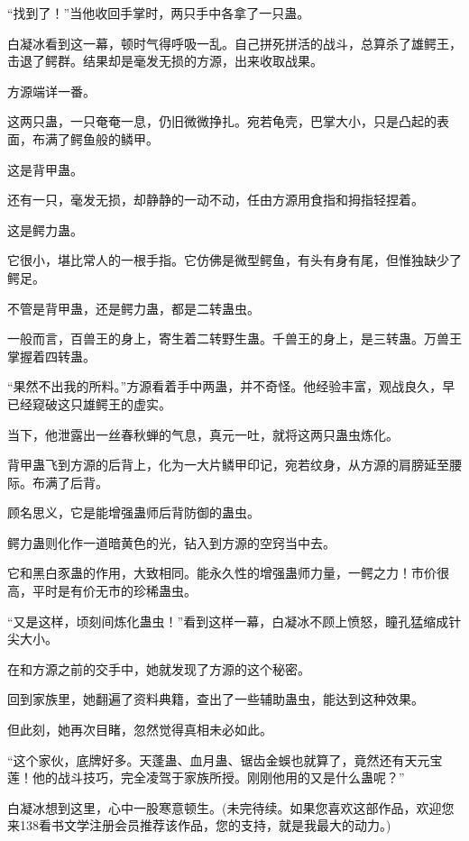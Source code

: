 \begin{this_body}
“找到了！”当他收回手掌时，两只手中各拿了一只蛊。

白凝冰看到这一幕，顿时气得呼吸一乱。自己拼死拼活的战斗，总算杀了雄鳄王，击退了鳄群。结果却是毫发无损的方源，出来收取战果。

方源端详一番。

这两只蛊，一只奄奄一息，仍旧微微挣扎。宛若龟壳，巴掌大小，只是凸起的表面，布满了鳄鱼般的鳞甲。

这是背甲蛊。

还有一只，毫发无损，却静静的一动不动，任由方源用食指和拇指轻捏着。

这是鳄力蛊。

它很小，堪比常人的一根手指。它仿佛是微型鳄鱼，有头有身有尾，但惟独缺少了鳄足。

不管是背甲蛊，还是鳄力蛊，都是二转蛊虫。

一般而言，百兽王的身上，寄生着二转野生蛊。千兽王的身上，是三转蛊。万兽王掌握着四转蛊。

“果然不出我的所料。”方源看着手中两蛊，并不奇怪。他经验丰富，观战良久，早已经窥破这只雄鳄王的虚实。

当下，他泄露出一丝春秋蝉的气息，真元一吐，就将这两只蛊虫炼化。

背甲蛊飞到方源的后背上，化为一大片鳞甲印记，宛若纹身，从方源的肩膀延至腰际。布满了后背。

顾名思义，它是能增强蛊师后背防御的蛊虫。

鳄力蛊则化作一道暗黄色的光，钻入到方源的空窍当中去。

它和黑白豕蛊的作用，大致相同。能永久性的增强蛊师力量，一鳄之力！市价很高，平时是有价无市的珍稀蛊虫。

“又是这样，顷刻间炼化蛊虫！”看到这样一幕，白凝冰不顾上愤怒，瞳孔猛缩成针尖大小。

在和方源之前的交手中，她就发现了方源的这个秘密。

回到家族里，她翻遍了资料典籍，查出了一些辅助蛊虫，能达到这种效果。

但此刻，她再次目睹，忽然觉得真相未必如此。

“这个家伙，底牌好多。天蓬蛊、血月蛊、锯齿金蜈也就算了，竟然还有天元宝莲！他的战斗技巧，完全凌驾于家族所授。刚刚他用的又是什么蛊呢？”

白凝冰想到这里，心中一股寒意顿生。(未完待续。如果您喜欢这部作品，欢迎您来138看书文学注册会员推荐该作品，您的支持，就是我最大的动力。)

\end{this_body}

